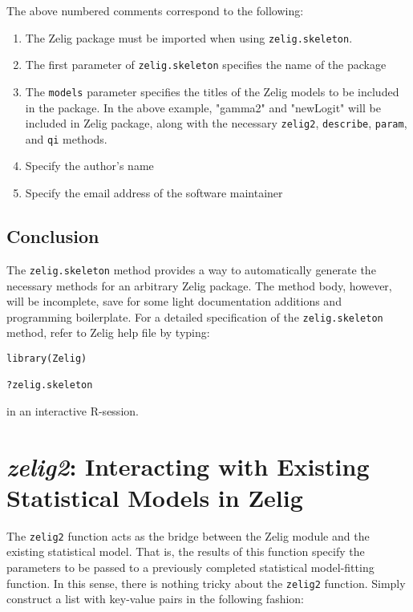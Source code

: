 \documentclass{article}
\newcommand{\code}[1]{{\tt #1}}
\begin{document}
The above numbered comments correspond to the following:

\begin{enumerate}
	\item The Zelig package must be imported when using \code{zelig.skeleton}.
	\item The first parameter of \code{zelig.skeleton} specifies the name of the package
	\item The \code{models} parameter specifies the titles of the Zelig models to be included in the package. In the above example, "gamma2" and "newLogit" will be included in Zelig package, along with the necessary \code{zelig2}, \code{describe}, \code{param}, and \code{qi} methods.
	\item Specify the author's name
	\item Specify the email address of the software maintainer
\end{enumerate}

\subsection{Conclusion}

The \code{zelig.skeleton} method provides a way to automatically generate the necessary methods for an arbitrary Zelig package. The method body, however, will be incomplete, save for some light documentation additions and programming boilerplate. For a detailed specification of the \code{zelig.skeleton} method, refer to Zelig help file by typing:

\begin{verbatim}
library(Zelig)

?zelig.skeleton
\end{verbatim}

{\noindent}in an interactive R-session.
 

\section{\emph{zelig2}: Interacting with Existing Statistical Models in Zelig}
\label{section:zelig2}

The \code{zelig2} function acts as the bridge between the Zelig module and
the existing statistical model. That is, the results of this function specify
the parameters to be passed to a previously completed statistical model-fitting
function. In this sense, there is nothing tricky about the \code{zelig2} function.
Simply construct a list with key-value pairs in the following fashion:
\end{document}
